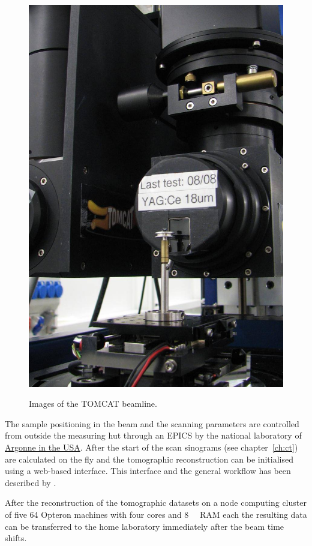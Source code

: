 \begin{figure}[htb]
{		\includegraphics[width=\imsize]{img/TOMCAT2}%
		\label{subfig:TOMCAT2}%
		}%
	\caption{Images of the TOMCAT beamline.}
\end{figure}

The sample positioning in the beam and the scanning parameters are controlled from outside the measuring hut through an \ac{EPICS} by the national laboratory of \href{http://www.aps.anl.gov/epics/}{Argonne in the USA}. After the start of the scan sinograms (see chapter~\ref{ch:ct}) are calculated on the fly and the tomographic reconstruction can be initialised using a web-based interface. This interface and the general workflow has been described by \citet{Hintermueller2010}.

After the reconstruction of the tomographic datasets on a node computing cluster of five \SI{64}{\bit} Opteron machines with four cores and \SI{8}{\giga\byte} \acs{RAM} each the resulting data can be transferred to the home laboratory immediately after the beam time shifts.